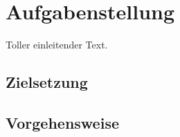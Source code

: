 \chapter{Aufgabenstellung}
\label{chapter:Aufgabenstellung}
Toller einleitender Text.

\section{Zielsetzung}
\blindtext

\section{Vorgehensweise}
\blindtext
